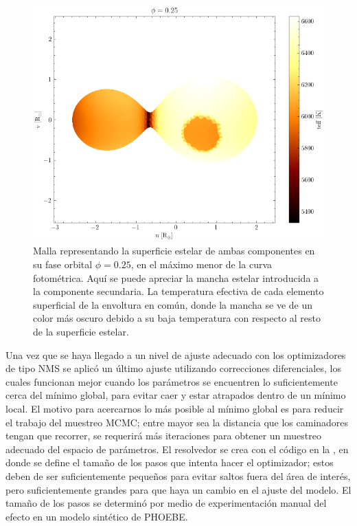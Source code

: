 \begin{figure}[!ht]
	\centering
	\includegraphics[scale=0.8]{Metodologia/Secciones/ModeloComputacional/Figures/Figura Malla Mancha NM.png}
	\caption{Malla representando la superficie estelar de ambas componentes en
	su fase orbital $\phi = 0.25$, en el máximo menor de la curva fotométrica.
	Aquí se puede apreciar la mancha estelar introducida a la componente
	secundaria. La temperatura efectiva de cada elemento superficial de la
	envoltura en común, donde la mancha se ve de un color más oscuro debido a su
	baja temperatura con respecto al resto de la superficie estelar.}
	\label{figuraMallaManchaNm}
\end{figure}

Una vez que se haya llegado a un nivel de ajuste adecuado con los optimizadores
de tipo NMS se aplicó un último ajuste utilizando correcciones diferenciales,
los cuales funcionan mejor cuando los parámetros se encuentren lo
suficientemente cerca del mínimo global, para evitar caer y estar atrapados
dentro de un mínimo local. El motivo para acercarnos lo más posible al mínimo
global es para reducir el trabajo del muestreo MCMC; entre mayor sea la
distancia que los caminadores tengan que recorrer, se requerirá más iteraciones
para obtener un muestreo adecuado del espacio de parámetros. El resolvedor se
crea con el código en la , en donde se define el
tamaño de los pasos que intenta hacer el optimizador; estos deben de ser
suficientemente pequeños para evitar saltos fuera del área de interés, pero
suficientemente grandes para que haya un cambio en el ajuste del modelo. El
tamaño de los pasos se determinó por medio de experimentación manual del efecto
en un modelo sintético de PHOEBE.

